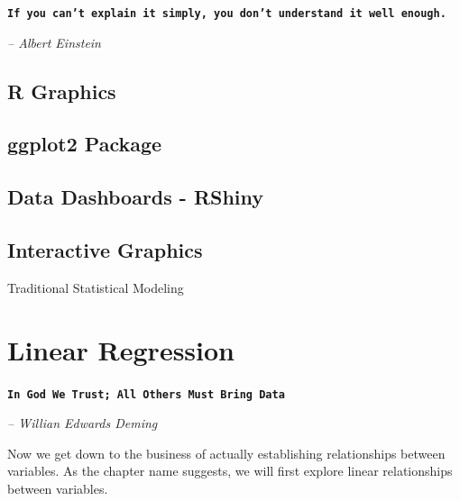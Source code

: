 \documentclass[11pt, letterpaper, twoside]{memoir}\usepackage{knitr}
\makeatletter
\newcommand{\chapterendsymbol}{
    \vspace{24pt}
    \Huge
    \hrulefill \hspace{0.1in} \hspace{0.1in} \hrulefill
    \normalsize
    }
\renewcommand\part{%
  \if@openright
    \cleardoublepage
  \else
    \clearpage
  \fi
  \thispagestyle{empty}
  \null\vfil
  \secdef\@part\@spart
  }
\makeatother
\begin{document}
\begin{flushright}

\textbf{\texttt{If you can't explain it simply, you don't understand it well enough.}}

\emph{-- Albert Einstein}

\end{flushright}

\vspace{12pt}


\section{R Graphics}

\section{ggplot2 Package}

\section{Data Dashboards - RShiny}

\section{Interactive Graphics}


\chapterendsymbol



\part{Traditional Statistical Modeling}




\chapter{Linear Regression}

\begin{flushright}

\textbf{\texttt{In God We Trust; All Others Must Bring Data}}

\emph{-- Willian Edwards Deming}

\end{flushright}

\vspace{12pt}


Now we get down to the business of actually establishing relationships between variables. As the chapter name suggests, we will first explore linear relationships between variables. 
\end{document}
